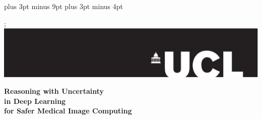 \documentclass[12pt,a4paper,twoside]{book}
\newcommand{\HRule}{\rule{\linewidth}{0.5mm}}
\newcommand{\FrontPageStyle}{\pagestyle{empty}}
\begin{document}
\belowdisplayskip=12pt plus 3pt minus 9pt
\belowdisplayshortskip=7pt plus 3pt minus 4pt

\FrontPageStyle{}

\begin{titlepage}
\begin{center}

% 
% 

\vspace*{-9em}; 
\hbox{ \hspace*{-18em} \includegraphics[width=1.7\textwidth]{images/univ_logo-eps-converted-to.pdf}}
\null%
\vspace*{7em}%

{\Large 

{ \Huge \textbf{Reasoning with Uncertainty \\ in Deep Learning \\ for Safer Medical Image Computing}\\ [0.4cm]}




}
\end{center}
\end{titlepage}
\end{document}
